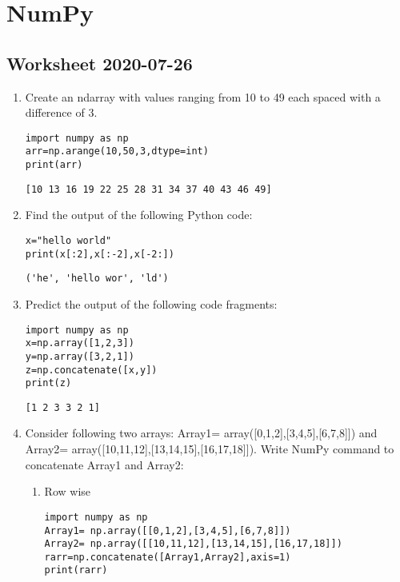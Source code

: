\documentclass[11pt]{article}
\begin{document}
\section{NumPy}
\label{sec:org309edb0}
\subsection{Worksheet 2020-07-26}
\label{sec:org39fda2d}

\begin{enumerate}
\item Create an ndarray with values ranging from 10 to 49 each spaced with a difference of 3.
\begin{verbatim}
import numpy as np
arr=np.arange(10,50,3,dtype=int)
print(arr)
\end{verbatim}

\begin{verbatim}
[10 13 16 19 22 25 28 31 34 37 40 43 46 49]
\end{verbatim}

\item Find the output of the following Python code:

\begin{verbatim}
x="hello world"
print(x[:2],x[:-2],x[-2:])
\end{verbatim}

\begin{verbatim}
('he', 'hello wor', 'ld')
\end{verbatim}

\item Predict the output of the following code fragments:

\begin{verbatim}
import numpy as np
x=np.array([1,2,3])
y=np.array([3,2,1])
z=np.concatenate([x,y])
print(z)
\end{verbatim}

\begin{verbatim}
[1 2 3 3 2 1]
\end{verbatim}

\item Consider following two arrays: Array1=
array([0,1,2],[3,4,5],[6,7,8]]) and Array2=
array([10,11,12],[13,14,15],[16,17,18]]). Write NumPy command to concatenate Array1 and Array2:

\begin{enumerate}
\item Row wise
\begin{verbatim}
import numpy as np
Array1= np.array([[0,1,2],[3,4,5],[6,7,8]])
Array2= np.array([[10,11,12],[13,14,15],[16,17,18]])
rarr=np.concatenate([Array1,Array2],axis=1)
print(rarr)
\end{verbatim}


\end{enumerate}
\end{enumerate}
\end{document}
